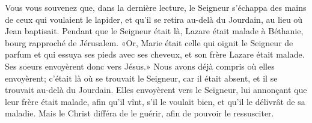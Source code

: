 Vous vous souvenez que, dans la dernière lecture,
	le Seigneur s’échappa des mains de ceux qui voulaient le lapider,
	et qu’il se retira au-delà du Jourdain, au lieu où Jean baptisait.
Pendant que le Seigneur était là,
	Lazare était malade à Béthanie, bourg rapproché de Jérusalem.
«Or, Marie était celle qui oignit le Seigneur de parfum
	et qui essuya ses pieds avec ses cheveux,
	et son frère Lazare était malade.
Ses soeurs envoyèrent donc vers Jésus.»
Nous avons déjà compris où elles envoyèrent;
	c’était là où se trouvait le Seigneur,
	car il était absent, et il se trouvait au-delà du Jourdain.
Elles envoyèrent vers le Seigneur, lui annonçant que leur frère était malade,
	afin qu’il vînt, s’il le voulait bien, et qu’il le délivrât de sa maladie.
Mais le Christ différa de le guérir, afin de pouvoir le ressusciter.
